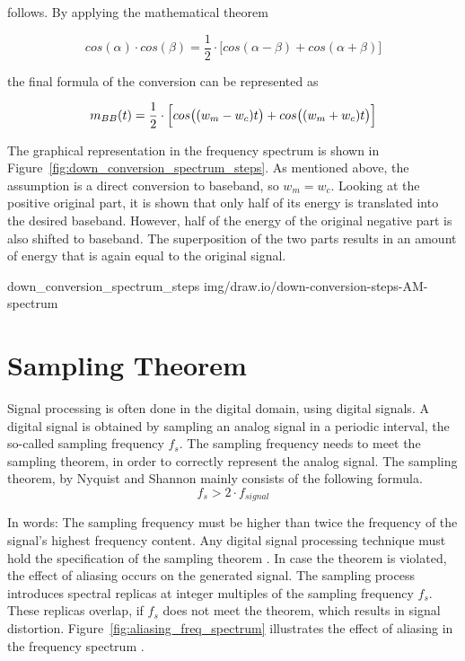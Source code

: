 \noindent
follows.
By applying the mathematical theorem

\begin{equation}
  cos(\alpha) \cdot cos(\beta) = \frac{1}{2} \cdot \bigl[ cos(\alpha-\beta) + cos(\alpha+\beta) \bigr]
\end{equation}

\noindent
the final formula of the conversion can be represented as

\begin{equation}
 m_{BB}(t) = \frac{1}{2} \cdot \Bigl[ cos\bigl((w_m-w_c)t\bigr) + cos\bigl((w_m+w_c)t\bigr) \Bigr]
\end{equation}

The graphical representation in the frequency spectrum is shown in Figure~\ref{fig:down_conversion_spectrum_steps}.
As mentioned above, the assumption is a direct conversion to baseband, so $w_m = w_c$.
Looking at the positive original part, it is shown that only half of its energy is translated into the desired baseband.
However, half of the energy of the original negative part is also shifted to baseband.
The superposition of the two parts results in an amount of energy that is again equal to the original signal.

 {down_conversion_spectrum_steps} {img/draw.io/down-conversion-steps-AM-spectrum}

\section{Sampling Theorem}
\label{sec:SamplingTheorem}

Signal processing is often done in the digital domain, using digital signals.
A digital signal is obtained by sampling an analog signal in a periodic interval, the so-called sampling frequency $f_s$.
The sampling frequency needs to meet the sampling theorem, in order to correctly represent the analog signal.
The sampling theorem, by Nyquist and Shannon mainly consists of the following formula.
\begin{equation}
  f_{s} > 2 \cdot f_{signal}
\end{equation}

In words: The sampling frequency must be higher than twice the frequency of the signal's highest frequency content.
Any digital signal processing technique must hold the specification of the sampling theorem \cite[Ch. 4.2]{AlessioSilviaMaria2016DSPa}.
In case the theorem is violated, the effect of aliasing occurs on the generated signal.
The sampling process introduces spectral replicas at integer multiples of the sampling frequency $f_s$.
These replicas overlap, if $f_s$ does not meet the theorem, which results in signal distortion.
Figure~\ref{fig:aliasing_freq_spectrum} illustrates the effect of aliasing in the frequency spectrum \cite{ThyagarajanK.S2019ItDS}.

